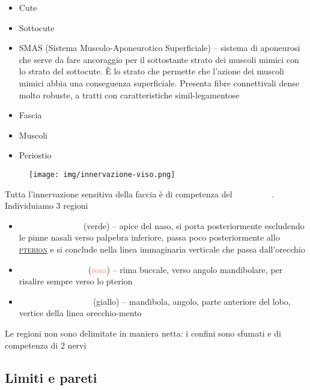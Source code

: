 \documentclass[italian,]{article}
\providecommand{\tightlist}{%
  \setlength{\itemsep}{0pt}\setlength{\parskip}{0pt}}
\newcommand{\ner}[1]{\colorbox{Dandelion}{\textcolor{white}{\textsc{#1}}}}
\renewcommand{\a}[1]{\underline{\textsc{#1}}}
\newcommand{\greenbox}[2]{\begin{tcolorbox}[title=#1,colback=green!5,colframe=green!35!black]#2\end{tcolorbox}} %
\begin{document}
\begin{itemize}
  \begin{itemize}
  \tightlist
  \item
    Cute
  \item
    Sottocute
  \item
    SMAS (Sistema Muscolo-Aponeurotico Superficiale) -- sistema di
    aponeurosi che serve da fare ancoraggio per il sottostante strato
    dei muscoli mimici con lo strato del sottocute. È lo strato che
    permette che l'azione dei muscoli mimici abbia una conseguenza
    superficiale. Presenta fibre connettivali dense molto robuste, a
    tratti con caratteristiche simil-legamentose
  \item
    Fascia
  \item
    Muscoli
  \item
    Periostio
  \end{itemize}
\end{itemize}

\greenbox{Innervazione e dermatomeri del viso}{

\begin{figure}[H]
\centering
\texttt{[image: img/innervazione-viso.png]}
\end{figure}

Tutta l'innervazione sensitiva della faccia è di competenza del \ner{trigemino}.
Individuiamo 3 regioni

\begin{itemize}
\tightlist
\item
  \ner{nervo oftalmico} (\textcolor{JungleGreen}{verde}) -- apice del
  naso, si porta posteriormente escludendo le pinne nasali verso
  palpebra inferiore, passa poco posteriormente allo \a{pterion} e si
  conclude nella linea immaginaria verticale che passa dall'orecchio
\item
  \ner{nervo mascellare} (\textcolor{Salmon}{rosa}) -- rima buccale,
  verso angolo mandibolare, per risalire sempre verso lo pterion
\item
  \ner{nervo mandibolare} (\textcolor{Dandelion}{giallo}) -- mandibola,
  angolo, parte anteriore del lobo, vertice della linea orecchio-mento
\end{itemize}

Le regioni non sono delimitate in maniera netta: i confini sono sfumati
e di competenza di 2 nervi

}

\hypertarget{limiti-e-pareti}{%
\subsection{Limiti e pareti}\label{limiti-e-pareti}}
\end{document}
